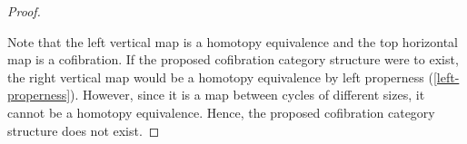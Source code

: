 \begin{proof}
\begin{figure}[H]
\end{figure}
Note that the left vertical map is a homotopy equivalence and the top horizontal map is a cofibration.
If the proposed cofibration category structure were to exist, the right vertical map would be a homotopy equivalence by left properness (\cref{left-properness}).
However, since it is a map between cycles of different sizes, it cannot be a homotopy equivalence.
Hence, the proposed cofibration category structure does not exist.
\end{proof}
